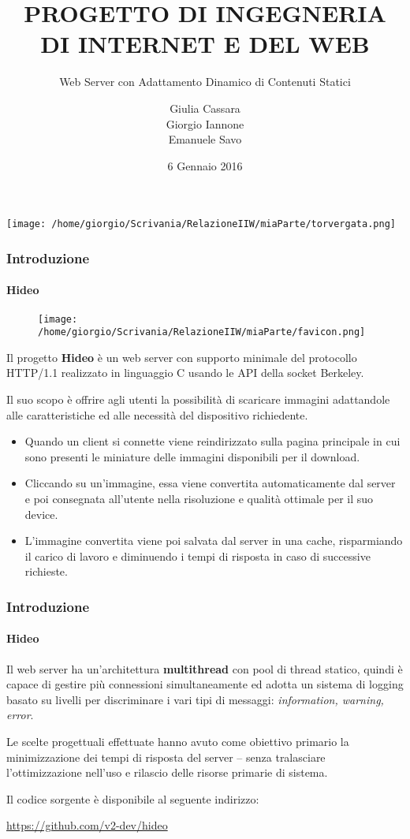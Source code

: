 \documentclass{beamer}
\title{\textbf{PROGETTO DI INGEGNERIA DI INTERNET E DEL WEB}}
\subtitle{Web Server con Adattamento Dinamico di Contenuti Statici}
\author{Giulia Cassara \\ 
 \medskip
Giorgio Iannone
\medskip
\\ Emanuele Savo
}
\date{6 Gennaio 2016}
\begin{document}
\begin{frame}
\centerline{\texttt{[image: /home/giorgio/Scrivania/RelazioneIIW/miaParte/torvergata.png]}\hspace{2em}}
\maketitle


\end{frame}


\begin{frame}
\frametitle{Introduzione}
\framesubtitle{Hideo}
\begin{figure}
	\texttt{[image: /home/giorgio/Scrivania/RelazioneIIW/miaParte/favicon.png]}
\end{figure}

Il progetto \textbf{Hideo} è un web server con supporto minimale del protocollo
HTTP/1.1 realizzato in linguaggio C usando le API della socket Berkeley.

\medskip

Il suo scopo è offrire agli utenti la possibilità di scaricare immagini adattandole alle caratteristiche ed alle necessità del
dispositivo richiedente.

\footnotesize
\begin{itemize}
\item Quando un client si connette viene reindirizzato sulla pagina principale in cui sono presenti le miniature delle immagini disponibili per il
download.
\item Cliccando su un’immagine, essa viene convertita automaticamente dal
server e poi consegnata all’utente nella risoluzione e qualità ottimale per il suo
device.
\item L’immagine convertita viene poi salvata dal server in una cache,
risparmiando il carico di lavoro e diminuendo i tempi di risposta in caso di
successive richieste.
\end{itemize}
\normalsize
\end{frame}


\begin{frame}
\frametitle{Introduzione}
\framesubtitle{Hideo}
Il web server ha un’architettura \textbf{multithread} con pool di thread statico, quindi è
capace di gestire più connessioni simultaneamente ed adotta un sistema di logging
basato su livelli per discriminare i vari tipi di messaggi: \textit{information, warning,
error}.

\medskip

Le scelte progettuali effettuate hanno avuto come obiettivo primario la
minimizzazione dei tempi di risposta del server – senza tralasciare
l’ottimizzazione nell’uso e rilascio delle risorse primarie di sistema.

\medskip

Il codice sorgente è disponibile al seguente indirizzo:

\medskip

\setlength{\parindent}{32pt} \href{https://github.com/v2-dev/hideo}{\color{blue}  https://github.com/v2-dev/hideo}


\end{frame}
\end{document}
